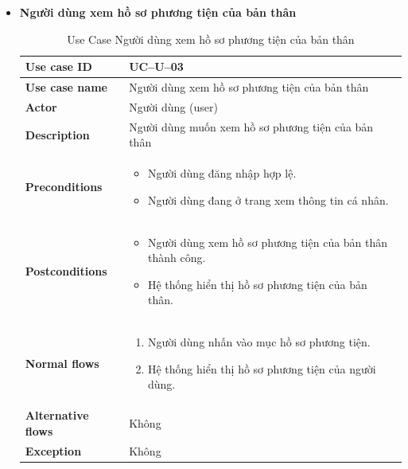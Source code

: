 \begin{itemize}
\item \textbf{Người dùng xem hồ sơ phương tiện của bản thân}
\begin{longtable}{|m{}|m{}|}
          \caption{Use Case Người dùng xem hồ sơ phương tiện của bản thân} \\
  \hline
  \textbf{Use case ID} & UC--U--03 \\
  \hline
  \textbf{Use case name} & Người dùng xem hồ sơ phương tiện của bản thân \\
  \hline
  \textbf{Actor} & Người dùng (user) \\
  \hline
  \textbf{Description} & Người dùng muốn xem hồ sơ phương tiện của bản thân \\
  \hline
  \textbf{Preconditions} &
  \begin{itemize}
    \item Người dùng đăng nhập hợp lệ.
    \item Người dùng đang ở trang xem thông tin cá nhân.
  \end{itemize}\\
  \hline
  \textbf{Postconditions} &
  \begin{itemize}
    \item Người dùng xem hồ sơ phương tiện của bản thân thành công.
    \item Hệ thống hiển thị hồ sơ phương tiện của bản thân.
  \end{itemize}\\
  \hline
  \textbf{Normal flows} &
  \begin{enumerate}[label=\arabic*.]
    \item Người dùng nhấn vào mục hồ sơ phương tiện.
    \item Hệ thống hiển thị hồ sơ phương tiện của người dùng.
  \end{enumerate}\\
  \hline
  \textbf{Alternative flows} & Không\\
  \hline
  \textbf{Exception} & Không\\
  \hline
  \end{longtable}


\end{itemize}
